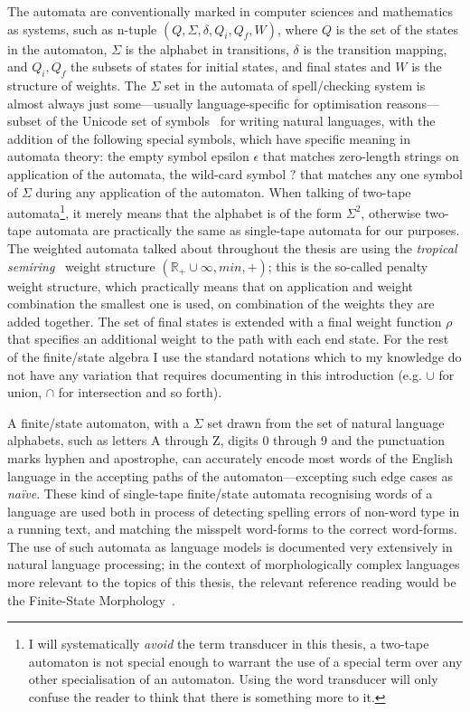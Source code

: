 \documentclass[officiallayout]{unihelcompling}
\begin{document}
The automata are conventionally marked in computer sciences and mathematics as
systems, such as n-tuple $(Q, \Sigma, \delta, Q_i, Q_f, W)$, where $Q$ is the
set of the states in the automaton, $\Sigma$ is the alphabet in transitions,
$\delta$ is the transition mapping, and $Q_i, Q_f$ the subsets of states for
initial states, and final states and $W$ is the structure of weights. The
$\Sigma$ set in the automata of spell\-/checking system is almost always just
some---usually language-specific for optimisation reasons---subset of the
Unicode set of symbols~\citep{unicode} for writing natural languages, with the
addition of the following special symbols, which have specific meaning in
automata theory: the empty symbol epsilon $\epsilon$ that matches zero-length
strings on application of the automata, the wild-card symbol $?$ that matches
any one symbol of $\Sigma$ during any application of the automaton.  When
talking of two-tape automata\footnote{I will systematically \emph{avoid} the
    term transducer in this thesis, a two-tape automaton is not special enough
    to warrant the use of a special term over any other specialisation of an
    automaton. Using the word transducer will only confuse the reader to think
that there is something more to it.}, it merely means that the alphabet is of
the form $\Sigma^2$, otherwise two-tape automata are practically the same as
single-tape automata for our purposes. The weighted automata talked about
throughout the thesis are using the \emph{tropical
semiring}~\cite{mohri1997finitestate} weight structure $(\mathbb{R}_+ \cup
\infty, min, +)$; this is the so-called penalty weight structure, which
practically means that on application and weight combination the smallest one
is used, on combination of the weights they are added together. The set of
final states is extended with a final weight function $\rho$ that specifies an
additional weight to the path with each end state. For the rest of the
finite\-/state algebra I use the standard notations which to my knowledge do
not have any variation that requires documenting in this introduction (e.g.
$\cup$ for union, $\cap$ for intersection and so forth).

A finite\-/state automaton, with a $\Sigma$ set drawn from the set of natural
language alphabets, such as letters A through Z, digits 0 through 9 and the
punctuation marks hyphen and apostrophe, can accurately encode most words of
the English language in the accepting paths of the automaton---excepting such
edge cases as \emph{naïve}. These kind of single-tape
finite\-/state automata recognising words of a language are used both in process
of detecting spelling errors of non-word type in a running text, and matching
the misspelt word-forms to the correct word-forms. The use of such automata as
language models is documented very extensively in natural language processing;
in the context of morphologically complex languages more relevant to the topics of
this thesis, the relevant reference reading would be the Finite-State Morphology~\citep{beesley2003finite,beesley2004morphological}.
\end{document}
